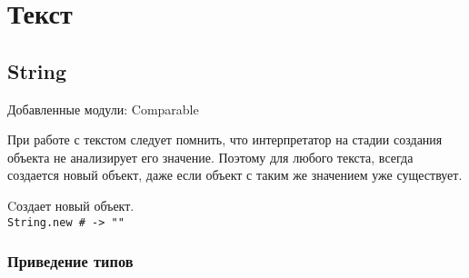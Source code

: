 \chapter{Текст}

\section{String}

Добавленные модули: Comparable

При работе с текстом следует помнить, что интерпретатор на стадии создания объекта не анализирует его значение. Поэтому для любого текста, всегда создается новый объект, даже если объект с таким же значением уже существует.

\begin{methodlist}
  Cоздает новый объект.
  \\\verb!String.new # -> ""!
\end{methodlist}

\subsection*{Приведение типов}

